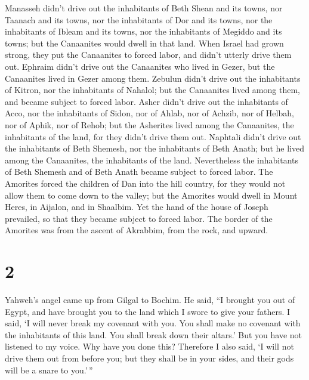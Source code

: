  Manasseh didn't drive out the inhabitants of Beth Shean
and its towns, nor Taanach and its towns, nor the inhabitants of Dor and
its towns, nor the inhabitants of Ibleam and its towns, nor the
inhabitants of Megiddo and its towns; but the Canaanites would dwell in
that land.  When Israel had grown strong, they put the
Canaanites to forced labor, and didn't utterly drive them out.
 Ephraim didn't drive out the Canaanites who lived in
Gezer, but the Canaanites lived in Gezer among them. 
Zebulun didn't drive out the inhabitants of Kitron, nor the inhabitants
of Nahalol; but the Canaanites lived among them, and became subject to
forced labor.  Asher didn't drive out the inhabitants of
Acco, nor the inhabitants of Sidon, nor of Ahlab, nor of Achzib, nor of
Helbah, nor of Aphik, nor of Rehob;  but the Asherites
lived among the Canaanites, the inhabitants of the land, for they didn't
drive them out.  Naphtali didn't drive out the inhabitants
of Beth Shemesh, nor the inhabitants of Beth Anath; but he lived among
the Canaanites, the inhabitants of the land. Nevertheless the
inhabitants of Beth Shemesh and of Beth Anath became subject to forced
labor.  The Amorites forced the children of Dan into the
hill country, for they would not allow them to come down to the valley;
 but the Amorites would dwell in Mount Heres, in Aijalon,
and in Shaalbim. Yet the hand of the house of Joseph prevailed, so that
they became subject to forced labor.  The border of the
Amorites was from the ascent of Akrabbim, from the rock, and upward.

\hypertarget{section-1}{%
\section{2}\label{section-1}}

 Yahweh's angel came up from Gilgal to Bochim. He said, ``I
brought you out of Egypt, and have brought you to the land which I swore
to give your fathers. I said, `I will never break my covenant with you.
 You shall make no covenant with the inhabitants of this
land. You shall break down their altars.' But you have not listened to
my voice. Why have you done this?  Therefore I also said, `I
will not drive them out from before you; but they shall be in your
sides, and their gods will be a snare to you.'\,''

